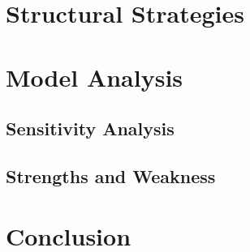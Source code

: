 \documentclass{mcmthesis}
\begin{document}
\section{Structural Strategies}
\section{Model Analysis}
\subsection{Sensitivity Analysis}
\subsection{Strengths and Weakness}
\section{Conclusion}


\newpage

\begin{appendices}


\end{appendices}
\end{document}
